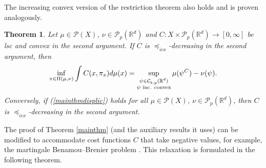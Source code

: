 \documentclass[reqno, a4paper]{amsart}
\newcommand{\lic}{\preceq_{icx}}
\newtheorem{theorem}{Theorem}[section]
\newcommand{\PP}{\mathcal{P}}
\newcommand{\R}{\mathbb R}
\theoremstyle{definition}
\theoremstyle{definition}
\theoremstyle{definition}
\begin{document}
The increasing convex version of the restriction theorem also holds and is proven analogously.
\begin{theorem} \label{mainthmic}
    Let $\mu\in\PP(X)$, $\nu \in \PP_p(\R^d)$ and $C:X\times\PP_p(\R^d)\to[0,\infty]$ be lsc and convex in the second argument. If $C$ is $\lic$-decreasing in the second argument, then 
\begin{align} \label{mainthmdisplic}
		\inf_{\pi\in\Pi(\mu,\nu)} \int C(x,\pi_x)d\mu(x)= \sup_{\substack{\psi \in  {\mathcal{C}}^{}_{b,p}(\R^d) \\ \psi\textnormal{ inc. convex}}} \mu(\psi^C) - \nu(\psi).
	\end{align}
    Conversely, if (\ref{mainthmdisplic}) holds for all $\mu\in\PP(X)$, $\nu\in\PP_p(\R^d)$, then $C$ is $\lic$-decreasing in the second argument.
\end{theorem}



    The proof of Theorem \ref{mainthm} (and the auxiliary results it uses) can be modified to accommodate cost functions $C$ that take negative values, for example, the martingale Benamou--Brenier problem \cite{backhoffveraguas2025existencebassmartingalesmartingale}. This relaxation is formulated in the following theorem.
    
\end{document}
